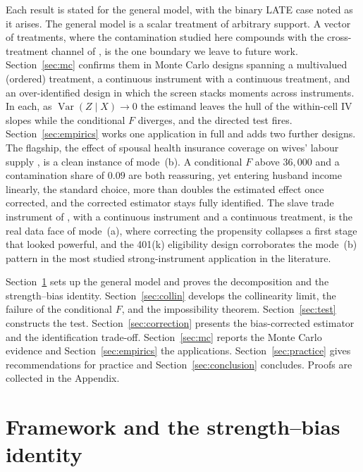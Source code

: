 \documentclass[preprint,11pt,authoryear]{elsarticle}
\theoremstyle{definition}
\newcommand{\Var}{\operatorname{Var}}
\begin{document}
Each result is stated for the general model, with the binary LATE case noted as it
arises. The general model is a scalar treatment of arbitrary support. A vector of treatments, where the contamination studied here compounds with the cross-treatment channel of \citet{goldsmith2024}, is the one boundary we leave to future work. Section~\ref{sec:mc} confirms them in Monte Carlo designs spanning a multivalued
(ordered) treatment, a continuous instrument with a continuous treatment, and an
over-identified design in which the screen stacks moments across instruments. In each, as $\Var(Z\mid X)\to0$ the estimand leaves the hull of the
within-cell IV slopes while the conditional $F$ diverges, and the directed test fires.
Section~\ref{sec:empirics} works one application in full and adds two further designs.
The flagship, the effect of spousal health insurance coverage on wives' labour supply
\citep{olson1998}, is a clean instance of mode~(b). A
conditional $F$ above $36{,}000$ and a contamination share of $0.09$ are both
reassuring, yet entering husband income linearly, the standard choice, more than
doubles the estimated effect once corrected, and the corrected estimator stays fully
identified. The slave trade instrument of \citet{nunn2011}, with a continuous instrument
and a continuous treatment, is the real data face of mode~(a), where correcting the
propensity collapses a first stage that looked powerful, and the 401(k) eligibility
design corroborates the mode~(b) pattern in the most studied strong-instrument
application in the literature.

Section~\ref{sec:framework} sets up the general model and proves the decomposition and
the strength--bias identity. Section~\ref{sec:collin} develops the collinearity limit,
the failure of the conditional $F$, and the impossibility theorem.
Section~\ref{sec:test} constructs the test. Section~\ref{sec:correction} presents the
bias-corrected estimator and the identification trade-off. Section~\ref{sec:mc} reports
the Monte Carlo evidence and Section~\ref{sec:empirics} the applications.
Section~\ref{sec:practice} gives recommendations for practice and
Section~\ref{sec:conclusion} concludes. Proofs are collected in the Appendix.
\section{Framework and the strength--bias identity}\label{sec:framework}
\end{document}
